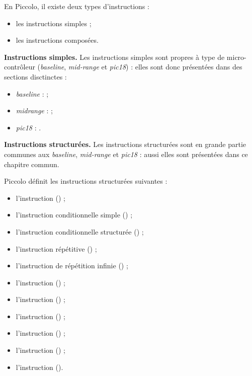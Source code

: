 
\cleardoublepage


\thispagestyle{empty}

En Piccolo, il existe deux types d'instructions :
\begin{itemize}
  \item les instructions simples ;
  \item les instructions composées.
\end{itemize}

\textbf{Instructions simples.} Les instructions simples sont propres à type de micro-contrôleur (\emph{baseline}, \emph{mid-range} et \emph{pic18}) : elles sont donc présentées dans des sections disctinctes :
\begin{itemize}
  \item \emph{baseline} :  ;
  \item \emph{midrange} :  ;
  \item \emph{pic18} : .
\end{itemize}


\textbf{Instructions structurées.} Les instructions structurées sont en grande partie communes aux \emph{baseline}, \emph{mid-range} et \emph{pic18} : aussi elles sont présentées dans ce chapitre commun.

Piccolo définit les instructions structurées suivantes :
\begin{itemize}
  \item l'instruction  () ;
  \item l'instruction conditionnelle simple () ;
  \item l'instruction conditionnelle structurée () ;
  \item l'instruction répétitive () ;
  \item l'instruction de répétition infinie () ;
  \item l'instruction  () ;
  \item l'instruction  () ;
  \item l'instruction  () ;
  \item l'instruction  () ;
  \item l'instruction  () ;
  \item l'instruction  ().
\end{itemize}

